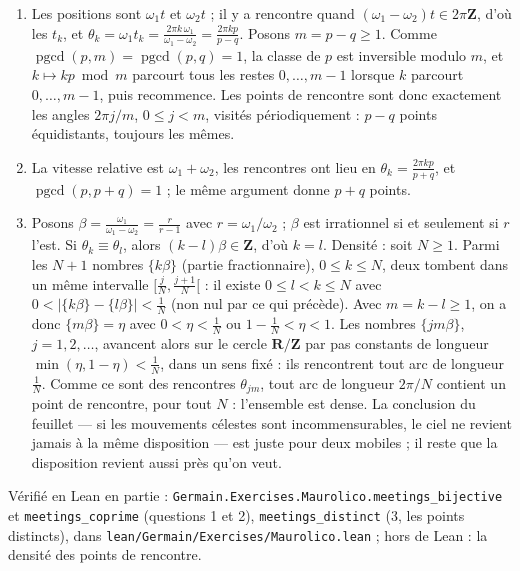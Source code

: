\documentclass[11pt,a4paper]{article}
\begin{document}
\begin{solution}
\begin{enumerate}
\item Les positions sont $\omega_1 t$ et $\omega_2 t$ ; il y a rencontre quand
  $(\omega_1 - \omega_2)t \in 2\pi\mathbf{Z}$, d'où les $t_k$, et
  $\theta_k = \omega_1 t_k = \frac{2\pi k\,\omega_1}{\omega_1 - \omega_2}
  = \frac{2\pi k p}{p-q}$. Posons $m = p - q \ge 1$. Comme
  $\operatorname{pgcd}(p, m) = \operatorname{pgcd}(p, q) = 1$, la classe de $p$ est
  inversible modulo $m$, et $k \mapsto kp \bmod m$ parcourt tous les restes
  $0, \dots, m-1$ lorsque $k$ parcourt $0, \dots, m-1$, puis recommence. Les
  points de rencontre sont donc exactement les angles $2\pi j/m$,
  $0 \le j < m$, visités périodiquement : $p - q$ points équidistants, toujours
  les mêmes.
\item La vitesse relative est $\omega_1 + \omega_2$, les rencontres ont lieu en
  $\theta_k = \frac{2\pi k p}{p+q}$, et $\operatorname{pgcd}(p, p+q) = 1$ ; le même
  argument donne $p + q$ points.
\item Posons $\beta = \frac{\omega_1}{\omega_1-\omega_2} = \frac{r}{r-1}$ avec
  $r = \omega_1/\omega_2$ ; $\beta$ est irrationnel si et seulement si $r$ l'est.
  Si $\theta_k \equiv \theta_l$, alors $(k - l)\beta \in \mathbf{Z}$, d'où $k = l$.
  Densité : soit $N \ge 1$. Parmi les $N+1$ nombres $\{k\beta\}$ (partie
  fractionnaire), $0 \le k \le N$, deux tombent dans un même intervalle
  $[\frac{j}{N}, \frac{j+1}{N}[$ : il existe $0 \le l < k \le N$ avec
  $0 < |\{k\beta\} - \{l\beta\}| < \frac1N$ (non nul par ce qui précède). Avec
  $m = k - l \ge 1$, on a donc $\{m\beta\} = \eta$ avec $0 < \eta < \frac1N$ ou
  $1 - \frac1N < \eta < 1$. Les nombres $\{jm\beta\}$, $j = 1, 2, \dots$, avancent
  alors sur le cercle $\mathbf{R}/\mathbf{Z}$ par pas constants de longueur
  $\min(\eta, 1 - \eta) < \frac1N$, dans un sens fixé : ils rencontrent tout arc
  de longueur $\frac1N$. Comme ce sont des rencontres $\theta_{jm}$, tout arc de
  longueur $2\pi/N$ contient un point de rencontre, pour tout $N$ : l'ensemble est
  dense. La conclusion du feuillet --- si les mouvements célestes sont
  incommensurables, le ciel ne revient jamais à la même disposition --- est
  juste pour deux mobiles ; il reste que la disposition revient aussi près qu'on
  veut.
\end{enumerate}

Vérifié en Lean en partie : \texttt{Germain.Exercises.Maurolico.meetings\_bijective} et
\texttt{meetings\_coprime} (questions 1 et 2), \texttt{meetings\_distinct} (3, les points
distincts), dans \texttt{lean/Germain/Exercises/Maurolico.lean} ; hors de Lean : la densité des points de rencontre.

\end{solution}
\end{document}
